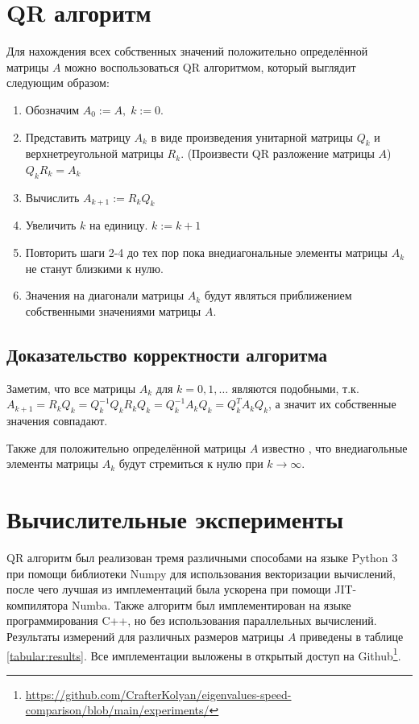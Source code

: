 \documentclass[12pt, fleqn]{article}
\begin{document}
\section{QR алгоритм}

Для нахождения всех собственных значений положительно определённой матрицы $A$ можно воспользоваться QR алгоритмом, который выглядит следующим образом:
\begin{enumerate}
	\item Обозначим $A_0 := A, \; k := 0$.
	\item Представить матрицу $A_k$ в виде произведения унитарной матрицы $Q_k$ и верхнетреугольной матрицы $R_k$. (Произвести QR разложение матрицы $A$) $Q_k R_k = A_k$
	\item Вычислить $A_{k+1} := R_k Q_k$
	\item Увеличить $k$ на единицу. $k := k + 1$
	\item Повторить шаги 2-4 до тех пор пока внедиагональные элементы матрицы $A_k$ не станут близкими к нулю.
	\item Значения на диагонали матрицы $A_k$ будут являться приближением собственными значениями матрицы $A$.
\end{enumerate}

\subsection{Доказательство корректности алгоритма}
Заметим, что все матрицы $A_k$ для $k = 0, 1, \dots$ являются подобными, т.к. \\
$A_{k + 1} = R_k Q_k = Q_k^{-1} Q_k R_k Q_k = Q_k^{-1} A_k Q_k = Q_k^T A_k Q_k$, а значит их собственные значения совпадают.

Также для положительно определённой матрицы $A$ известно \cite{QR}, что внедиагольные элементы матрицы $A_k$ будут стремиться к нулю при $k \to \infty$.

\section{Вычислительные эксперименты}

QR алгоритм был реализован тремя различными способами на языке Python 3 при помощи библиотеки Numpy для использования векторизации вычислений, после чего лучшая из имплементаций была ускорена при помощи JIT-компилятора Numba. Также алгоритм был имплементирован на языке программирования C++, но без использования параллельных вычислений. Результаты измерений для различных размеров матрицы $A$ приведены в таблице \ref{tabular:results}. Все имплементации выложены в открытый доступ на Github\footnote{\url{https://github.com/CrafterKolyan/eigenvalues-speed-comparison/blob/main/experiments/}}.
\end{document}
